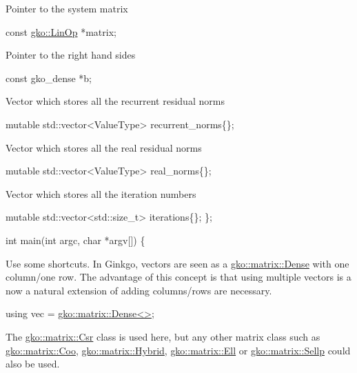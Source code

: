 Pointer to the system matrix


\begin{DoxyCode}
\textcolor{keyword}{const} \hyperlink{classgko_1_1LinOp}{gko::LinOp} *matrix;
\end{DoxyCode}


Pointer to the right hand sides


\begin{DoxyCode}
\textcolor{keyword}{const} gko\_dense *b;
\end{DoxyCode}


Vector which stores all the recurrent residual norms


\begin{DoxyCode}
\textcolor{keyword}{mutable} std::vector<ValueType> recurrent\_norms\{\};
\end{DoxyCode}


Vector which stores all the real residual norms


\begin{DoxyCode}
\textcolor{keyword}{mutable} std::vector<ValueType> real\_norms\{\};
\end{DoxyCode}


Vector which stores all the iteration numbers


\begin{DoxyCode}
    \textcolor{keyword}{mutable} std::vector<std::size\_t> iterations\{\};
\};


\textcolor{keywordtype}{int} main(\textcolor{keywordtype}{int} argc, \textcolor{keywordtype}{char} *argv[])
\{
\end{DoxyCode}


Use some shortcuts. In Ginkgo, vectors are seen as a \hyperlink{classgko_1_1matrix_1_1Dense}{gko\+::matrix\+::\+Dense} with one column/one row. The advantage of this concept is that using multiple vectors is a now a natural extension of adding columns/rows are necessary.


\begin{DoxyCode}
\textcolor{keyword}{using} vec = \hyperlink{classgko_1_1matrix_1_1Dense}{gko::matrix::Dense<>};
\end{DoxyCode}


The \hyperlink{classgko_1_1matrix_1_1Csr}{gko\+::matrix\+::\+Csr} class is used here, but any other matrix class such as \hyperlink{classgko_1_1matrix_1_1Coo}{gko\+::matrix\+::\+Coo}, \hyperlink{classgko_1_1matrix_1_1Hybrid}{gko\+::matrix\+::\+Hybrid}, \hyperlink{classgko_1_1matrix_1_1Ell}{gko\+::matrix\+::\+Ell} or \hyperlink{classgko_1_1matrix_1_1Sellp}{gko\+::matrix\+::\+Sellp} could also be used.


